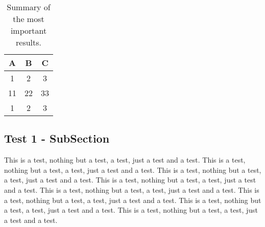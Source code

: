 \documentclass[12pt,twoside]{report}
\begin{document}
%
\begin{table}[tbh]
\caption{Summary of the most important results.}
%
\begin{center}
  \begin{tabular}{|c|cc|}
    \hline
    A   & B   & C  \\
    \hline
    1   & 2   & 3   \\
    11  & 22  & 33  \\
    1   & 2   & 3   \\
    \hline
  \end{tabular}
\end{center}
\label{Tab:table1}
\end{table}


\subsection{Test 1 - SubSection}

This is a test, nothing but a test, a test, just a test and a test.
This is a test, nothing but a test, a test, just a test and a test.
This is a test, nothing but a test, a test, just a test and a test.
This is a test, nothing but a test, a test, just a test and a test.
This is a test, nothing but a test, a test, just a test and a test.
This is a test, nothing but a test, a test, just a test and a test.
This is a test, nothing but a test, a test, just a test and a test.
This is a test, nothing but a test, a test, just a test and a test.
\end{document}
